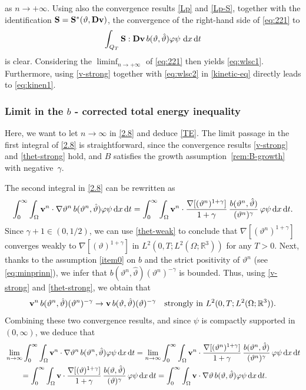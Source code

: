 \documentclass[11pt, a4paper, reqno]{amsart}
\newcommand{\R}{{\mathbb R}}
\numberwithin{equation}{section}
\newcommand{\thetah}{\hat\thet}
\newcommand{\vc}[1]{{\bf #1}}
\newcommand{\vv}{\vc{v}}
\newcommand{\thet}{\vartheta}
\renewcommand{\S}{\mathbf{S}}
\newcommand{\D}{\mathbf{D}}
\newcommand{\dt}{\,{\rm d} t }
\newcommand{\dx}{\,{\rm d} {x}}
\newcommand{\dxdt}{\dx  \dt}
\newcommand{\intnO}[1]{\int_0^{\infty}\intO{ #1 }\dt}
\newcommand{\intO}[1]{\int_{\Omega} #1 \dx}
\newcommand{\bb}{b}
\begin{document}
as $n \to +\infty$. Using also the convergence results \eqref{Lp} and \eqref{Lp-S}, together with the identification $\S = \S^*(\thet, \D\vv)$, the convergence of the right-hand side of \eqref{eq:221} to 
$$
\int_{Q_T} \S : \D\vv \, \bb(\thet, \thetah) \varphi \psi \, \dxdt
$$ 
is clear. Considering the $\liminf_{n \to +\infty}$ of \eqref{eq:221} then yields \eqref{eq:wlsc1}.
Furthermore, using \eqref{v-strong} together with \eqref{eq:wlsc2} in \eqref{kinetic-eq} directly leads to  \eqref{eq:kinen1}.




\subsubsection{Limit in the $b$ - corrected total energy inequality}\label{sec:lvteb}
Here, we want to let $n \to \infty$ in \eqref{2.8} and deduce \eqref{TE}. The limit passage in the first integral of \eqref{2.8} is straightforward, since the convergence results \eqref{v-strong} and \eqref{thet-strong} hold, and $B$ satisfies the growth assumption~\eqref{rem:B-growth} with negative~$\gamma$.


The second integral in \eqref{2.8} can be rewritten as
$$
\intnO{\vv^{n}\cdot\nabla \thet^{n}\,\bb(\thet^n, \thetah)\varphi \psi}
=\intnO{\vv^{n}\cdot\frac{\nabla[(\thet^{n})^{1+\gamma}]}{1+\gamma}\,
\frac{\bb(\thet^n, \thetah)}{(\thet^n)^\gamma}\,\varphi \psi}.
$$
Since $\gamma+1 \in (0,1/2)$, we can use \eqref{thet-weak} to conclude that  
$\nabla[(\thet^{n})^{1+\gamma}]$ converges weakly to $\nabla[(\thet)^{1+\gamma}]$ in 
$L^2(0,T;L^2(\Omega;\R^3))$ for any $T>0$.  Next, thanks to the assumption \eqref{item0} on $\bb$ and the strict positivity of $\thet^n$ (see \eqref{eq:minprinn}), we infer that $\bb(\thet^n,\thetah)(\thet^n)^{-\gamma}$ is bounded. Thus, using \eqref{v-strong} and \eqref{thet-strong}, we obtain that 
$$
\vv^{n}\,\bb(\thet^n,\thetah)(\thet^n)^{-\gamma} \to 
\vv\,\bb(\thet,\thetah)(\thet)^{-\gamma} 
\quad\text{strongly in } L^2(0,T;L^2(\Omega;\R^3)).
$$
Combining these two convergence results, and since $\psi$ is compactly supported in $(0,\infty)$, we deduce that  
$$
\begin{aligned}
&\lim_{n\to \infty}\intnO{\vv^{n}\cdot\nabla \thet^{n}\,\bb(\thet^n, \thetah)\varphi \psi}
=\lim_{n\to \infty}\intnO{\vv^{n}\cdot\frac{\nabla[(\thet^{n})^{1+\gamma}]}{1+\gamma}\,
\frac{\bb(\thet^n, \thetah)}{(\thet^n)^\gamma}\,\varphi \psi} \\
&\qquad =\intnO{\vv\cdot\frac{\nabla[(\thet)^{1+\gamma}]}{1+\gamma}\,
\frac{\bb(\thet, \thetah)}{(\thet)^\gamma}\,\varphi \psi} =\intnO{\vv\cdot\nabla \thet\,\bb(\thet, \thetah)\varphi \psi}.
\end{aligned}
$$
\end{document}
